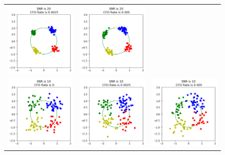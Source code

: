 \begin{figure}
\begin{tabular}{ccc}
    \includegraphics[width=50mm]{figures/cfo_intro/snr_20/cfo_1.png}&
    \includegraphics[width=50mm]{figures/cfo_intro/snr_20/cfo_2.png}\\
    \includegraphics[width=50mm]{figures/cfo_intro/snr_10/cfo_0.png}&
    \includegraphics[width=50mm]{figures/cfo_intro/snr_10/cfo_1.png}&
    \includegraphics[width=50mm]{figures/cfo_intro/snr_10/cfo_2.png}
  \end{tabular}
  \label{fig:single_tap_cfo}
\end{figure}

